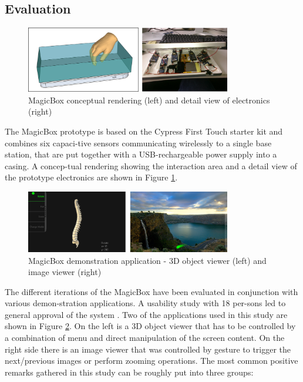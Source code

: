 \subsection{Evaluation}
\begin{figure}[h]
\centering
\includegraphics[width=0.8\textwidth]{images/magicbox_proto}
\caption{MagicBox conceptual rendering (left) and detail view of electronics (right) \cite{Braun2011MultiInputDevice}}
\label{fig:magicbox_proto}
\end{figure}
The MagicBox prototype is based on the Cypress First Touch starter kit \cite{cypressfirst} and combines six capaci-tive sensors communicating wirelessly to a single base station, that are put together with a USB-rechargeable power supply into a casing. A concep-tual rendering showing the interaction area and a detail view of the prototype electronics are shown in Figure \ref{fig:magicbox_proto}.
\begin{figure}[h]
\centering
\includegraphics[width=0.8\textwidth]{images/magicbox_eval}
\caption{MagicBox demonstration application - 3D object viewer (left) and image viewer (right) \cite{Braun2011MultiInputDevice}}
\label{fig:magicbox_eval}
\end{figure}
The different iterations of the MagicBox have been evaluated in conjunction with various demon-stration applications. A usability study with 18 per-sons led to general approval of the system \cite{Braun2011MultiInputDevice}. Two of the applications used in this study are shown in Figure \ref{fig:magicbox_eval}. On the left is a 3D object viewer that has to be controlled by a combination of menu and direct manipulation of the screen content. On the right side there is an image viewer that was controlled by gesture to trigger the next/previous images or perform zooming operations. The most common positive remarks gathered in this study can be roughly put into three groups:
